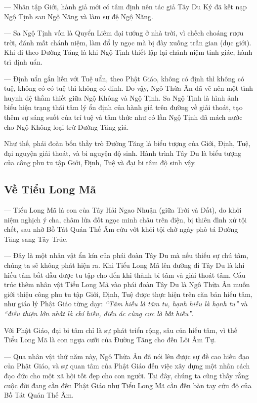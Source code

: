 — Nhân tập Giới, hành giả mới có tâm định nên tác giả Tây Du Ký đã kết nạp Ngộ Tịnh sau Ngộ Năng và làm sư đệ Ngộ Năng.

— Sa Ngộ Tịnh vốn là Quyển Liêm đại tướng ở nhà trời, vì chếch choáng rượu trời, đánh mất chánh niệm, làm đổ ly ngọc mà bị đày xuống trần gian (dục giới). Khi đi theo Đường Tăng là khi Ngộ Tịnh thiết lập lại chánh niệm tỉnh giác, hành trì định uẩn.

— Định uẩn gắn liền với Tuệ uẩn, theo Phật Giáo, không có định thì không có tuệ, không có có tuệ thì không có định. Do vậy, Ngô Thừa Ân đã vẽ nên một tình huynh đệ thắm thiết giữa Ngộ Không và Ngộ Tịnh. Sa Ngộ Tịnh là hình ảnh biểu hiện trạng thái tâm lý ổn định của hành giả trên đường về giải thoát, tạo thêm sự sáng suốt của trí tuệ và tâm thức như có lần Ngộ Tịnh đã mách nước cho Ngộ Không loại trừ Đường Tăng giả.

Như thế, phái đoàn bốn thầy trò Đường Tăng là biểu tượng của Giới, Định, Tuệ, đại nguyện giải thoát, và bi nguyện độ sinh. Hành trình Tây Du là biểu tượng của công phu tu tập Giới, Định, Tuệ và đại bi tâm độ sinh vậy.

\subsection{Về Tiểu Long Mã} %
\label{sub:ve_tieu_long_ma}

— Tiểu Long Mã là con của Tây Hải Ngao Nhuận (giữa Trời và Đất), do khởi niệm nghịch ý cha, châm lửa đốt ngọc minh châu trên điện, bị thiên đình xử tội chết, sau nhờ Bồ Tát Quán Thế Âm cứu vớt khỏi tội chờ ngày phò tá Đường Tăng sang Tây Trúc.

— Đây là một nhân vật ẩn kín của phái đoàn Tây Du mà nếu thiếu sự chú tâm, chúng ta sẽ không phát hiện ra. Khi Tiểu Long Mã lên đường đi Tây Du là khi hiếu tâm bắt đầu được tu tập cho đến khi thành bi tâm và giải thoát tâm. Cấu trúc thêm nhân vật Tiểu Long Mã vào phái đoàn Tây Du là Ngô Thừa Ân muốn giới thiệu công phu tu tập Giới, Định, Tuệ được thực hiện trên căn bản hiếu tâm, như giáo lý Phật Giáo từng dạy: \emph{``Tâm hiếu là tâm tu, hạnh hiếu là hạnh tu''} và \emph{``điều thiện lớn nhất là chí hiếu, điều ác cùng cực là bất hiếu''}.

Với Phật Giáo, đại bi tâm chỉ là sự phát triển rộng, sâu của hiếu tâm, vì thế Tiểu Long Mã là con ngựa cưỡi của Đường Tăng cho đến Lôi Âm Tự.

— Qua nhân vật thứ năm này, Ngô Thừa Ân đã nói lên được sự đề cao hiếu đạo của Phật Giáo, và sự quan tâm của Phật Giáo đến việc xây dựng một nhân cách đạo đức cho một xã hội tốt đẹp cho con người. Tại đây, chúng ta cũng thấy rằng cuộc đời đang cần đến Phật Giáo như Tiểu Long Mã cần đến bàn tay cứu độ của Bồ Tát Quán Thế Âm.

